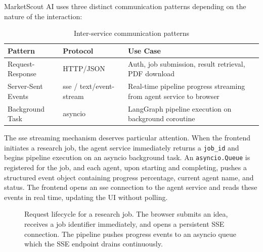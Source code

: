 \documentclass[12pt,a4paper,oneside]{book}
\begin{document}
MarketScout AI uses three distinct communication patterns depending on the nature of the interaction:

\begin{table}[H]
\centering
\caption{Inter-service communication patterns}
\label{tab:comm_patterns}
\begin{tabularx}{\textwidth}{llX}
\toprule
\textbf{Pattern} & \textbf{Protocol} & \textbf{Use Case} \\
\midrule
Request-Response & HTTP/JSON & Auth, job submission, result retrieval, PDF download \\
Server-Sent Events & \gls{sse} / text/event-stream & Real-time pipeline progress streaming from agent service to browser \\
Background Task & asyncio & LangGraph pipeline execution on background coroutine \\
\bottomrule
\end{tabularx}
\end{table}

The \gls{sse} streaming mechanism deserves particular attention. When the frontend initiates a research job, the agent service immediately returns a \texttt{job\_id} and begins pipeline execution on an asyncio background task. An \texttt{asyncio.Queue} is registered for the job, and each agent, upon starting and completing, pushes a structured event object containing progress percentage, current agent name, and status. The frontend opens an \gls{sse} connection to the agent service and reads these events in real time, updating the UI without polling.

\begin{figure}[H]
\centering
{}
\caption{Request lifecycle for a research job. The browser submits an idea, receives a job identifier immediately, and opens a persistent SSE connection. The pipeline pushes progress events to an asyncio queue which the SSE endpoint drains continuously.}
\label{fig:request_lifecycle}
\end{figure}
\end{document}
